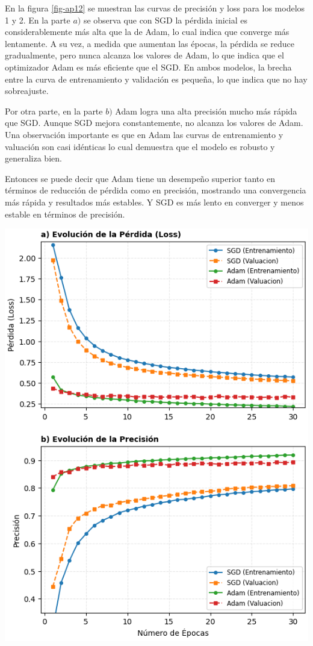 \documentclass[aps,prl,reprint,groupedaddress]{revtex4-2}
\newenvironment{Figura}
  {\par\medskip\noindent\minipage{\linewidth}}
  {\endminipage\par\medskip}
\begin{document}
En la figura \ref{fig-ap12} se muestran las curvas de precisión y loss para los
modelos 1 y 2. En la parte $a)$ se observa que con SGD la pérdida inicial es 
considerablemente más alta que la de Adam, lo cual indica que converge más 
lentamente.  A su vez, a medida que aumentan las épocas, la pérdida se reduce 
gradualmente, pero nunca alcanza los valores de Adam, lo que indica que el
optimizador Adam es más eficiente que el SGD. En ambos modelos, la brecha 
entre la curva de entrenamiento y validación es pequeña, lo que indica que no
hay sobreajuste.

Por otra parte, en la parte $b)$ Adam logra una alta precisión mucho más rápida
que SGD. Aunque SGD mejora constantemente, no alcanza los valores de Adam. 
Una observación importante es que en Adam las curvas de entrenamiento y 
valuación son casi idénticas lo cual demuestra que el modelo es robusto y 
generaliza bien.

Entonces se puede decir que Adam tiene un desempeño superior tanto en términos 
de reducción de pérdida como en precisión, mostrando una convergencia más 
rápida y resultados más estables. Y SGD es más lento en converger y menos
estable en términos de precisión. 

\begin{Figura}
  \centering
  \includegraphics[width=1\textwidth]{figs/modelos_plots.png}
  \label{fig-ap12}
\end{Figura}
\end{document}
